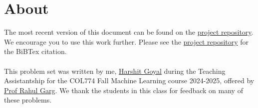\section{About}
The most recent version of this document can be found on the \href{https://github.com/Harshit0143/COL774-Machine-Learning-Fall-2024-2025.git}{project repository}. We encourage you to use this work further. Please see the \href{https://github.com/Harshit0143/COL774-Machine-Learning-Fall-2024-2025.git}{project repository} for the BiBTex citation.\\\\
This problem set was written by me, \href{https://github.com/Harshit0143/}{Harshit Goyal} during the Teaching Assistantship for the COL774 Fall Machine Learning course 2024-2025, offered by \href{https://www.cse.iitd.ac.in/~rahulgarg/}{Prof Rahul Garg}. We thank the students in this class for feedback on many of these problems.